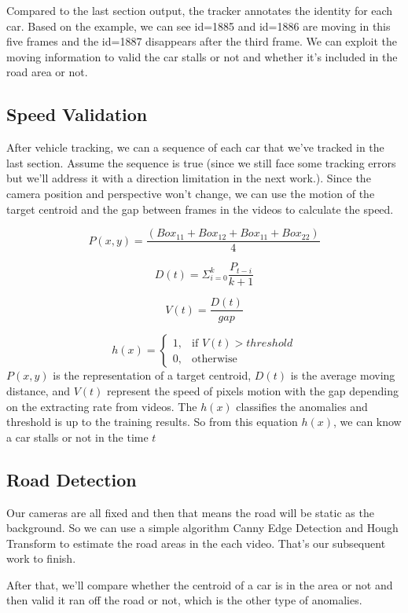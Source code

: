 \documentclass[10pt,twocolumn,letterpaper]{article}
\begin{document}
Compared to the last section output, the tracker annotates the identity for each car. Based on the example, we can see id=1885 and id=1886 are moving in this five frames and the id=1887 disappears after the third frame. We can exploit the moving information to valid the car stalls or not and whether it's included in the road area or not.


\subsection{Speed Validation}

After vehicle tracking, we can a sequence of each car that we've tracked in the last section. Assume the sequence is true (since we still face some tracking errors but we'll address it with a direction limitation in the next work.). Since the camera position and perspective won't change, we can use the motion of the target centroid and the gap between frames in the videos to calculate the speed.

$$P(x, y) = \frac{(Box_{11} +  Box_{12} + Box_{11} +  Box_{22})}{4}$$

$$D(t) = \Sigma_{i=0}^{k}\frac{P_{t-i}}{k+1}$$

$$V(t) = \frac{D(t)}{gap}$$

\[
    h(x)= 
\begin{cases}
    1,& \text{if } V(t) > threshold\\
    0,              & \text{otherwise}
\end{cases}
\]
$P(x,y)$ is the representation of a target centroid, $D(t)$ is the average moving distance, and $V(t)$ represent the speed of pixels motion with the gap depending on the extracting rate from videos. The $h(x)$ classifies the anomalies and threshold is up to the training results. So from this equation $h(x)$, we can know a car stalls or not in the time $t$


\subsection{Road Detection}

Our cameras are all fixed and then that means the road will be static as the background. So we can use a simple algorithm Canny Edge Detection and Hough Transform to estimate the road areas in the each video. That's our subsequent work to finish.

After that, we'll compare whether the centroid of a car is in the area or not and then valid it ran off the road or not, which is the other type of anomalies. 
\end{document}
